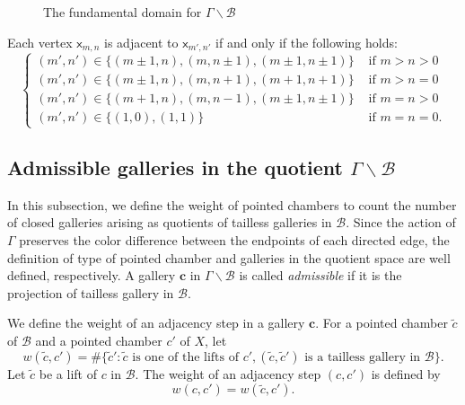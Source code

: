 \documentclass[11pt]{amsart}
\theoremstyle{definition}
\theoremstyle{remark}
\numberwithin{equation}{section}
\begin{document}
\begin{figure}[H]
\begin{center}
\begin{tikzpicture}[scale=0.52]
\end{tikzpicture}
\end{center}
\caption{The fundamental domain for $\Gamma\backslash\mathcal{B}$}\label{fig:funddom}
\end{figure}


Each vertex $\mathsf{x}_{m,n}$ is adjacent to $\mathsf{x}_{m',n'}$ if and only if the following holds:
\begin{displaymath}
\begin{cases} (m',n')\in\{(m\pm1,n),(m,n\pm1),(m\pm1,n\pm1)\} &\text{ if }m>n>0\\
(m',n')\in \{(m\pm1,n),(m,n+1),(m+1,n+1)\} &\text{ if }m>n=0\\
(m',n')\in \{(m+1,n),(m,n-1),(m\pm1,n\pm1)\} &\text{ if }m=n>0\\
(m',n')\in \{(1,0),(1,1)\}&\text{ if }m=n=0.
\end{cases}
\end{displaymath}




\subsection{Admissible galleries in the quotient $\Gamma \backslash \mathcal{B}$}\label{sec:3.2} In this subsection, we define the weight of pointed chambers to count the number of closed galleries arising as quotients of tailless galleries in $\mathcal{B}$. Since the action of $\Gamma$ preserves the color difference between the endpoints of each directed edge, the definition of type of pointed chamber and galleries in the quotient space are well defined, respectively.
 A gallery $\mathbf{c}$ in $\Gamma\backslash \mathcal{B}$ is called \emph{admissible} if it is the projection of tailless gallery in $\mathcal{B}.$
 
We define the weight of an adjacency step in a gallery $\mathbf{c}$. For a pointed chamber $\widetilde{c}$ of $\mathcal{B}$ and a pointed chamber $c'$ of $X$, let
$$w(\widetilde{c},c')=\#\{\widetilde{c}'\colon\widetilde{c}\textrm{ is one of the lifts }\textrm {of }c',(\widetilde{c},\widetilde{c}') \textrm{ is a tailless gallery in }\mathcal{B}\}.$$ 
Let $\widetilde{c}$ be a lift of $c$ in $\mathcal{B}$. The weight of an adjacency step $(c,c')$ is defined by $$w(c,c')=w(\widetilde{c},c').$$ 

\end{document}
